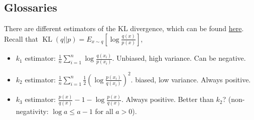 \subsection{Glossaries}
\begin{definition}\label{def:kl-est}
    There are different estimators of the KL divergence, which can be found \href{http://joschu.net/blog/kl-approx.html}{here}. Recall that $\operatorname{KL}(q||p)=E_{x\sim q}\left[\log \frac{q(x)}{p(x)}\right]$,
    
    \begin{itemize}
        \item $k_1$ estimator: $\frac{1}{n}\sum_{i=1}^{n} \log \frac{q(x_i)}{p(x_i)}$. Unbiased, high variance. Can be negative.
        \item $k_2$ estimator:  $\frac{1}{n}\sum_{i=1}^{n} \frac{1}{2}\left(\log \frac{p(x_i)}{q(x_i)}\right)^2$. biased, low variance. Always positive.
        \item  $k_3$ estimator: $\frac{p(x)}{q(x)} - 1 - \log \frac{p(x)}{q(x)}$. Always positive. Better than $k_2$? (non-negativity: $\log a \leq a - 1$ for all $a>0$).
    \end{itemize}
\end{definition}


